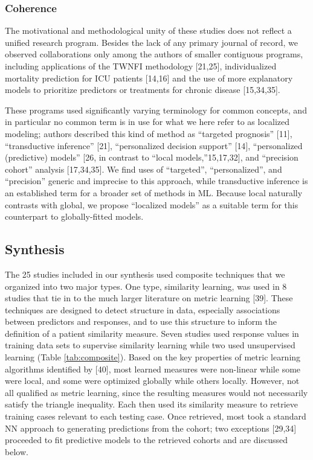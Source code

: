\documentclass[preprint, 3p,
authoryear]{elsarticle} %
\begin{document}
\hypertarget{coherence}{%
\subsubsection{Coherence}\label{coherence}}

The motivational and methodological unity of these studies does not
reflect a unified research program. Besides the lack of any primary
journal of record, we observed collaborations only among the authors of
smaller contiguous programs, including applications of the TWNFI
methodology {[}21,25{]}, individualized mortality prediction for ICU
patients {[}14,16{]} and the use of more explanatory models to
prioritize predictors or treatments for chronic disease {[}15,34,35{]}.

These programs used significantly varying terminology for common
concepts, and in particular no common term is in use for what we here
refer to as localized modeling; authors described this kind of method as
``targeted prognosis'' {[}11{]}, ``transductive inference'' {[}21{]},
``personalized decision support'' {[}14{]}, ``personalized (predictive)
models'' {[}26, in contrast to ``local models,''15,17,32{]}, and
``precision cohort'' analysis {[}17,34,35{]}. We find uses of
``targeted'', ``personalized'', and ``precision'' generic and imprecise
to this approach, while transductive inference is an established term
for a broader set of methods in ML. Because local naturally contrasts
with global, we propose ``localized models'' as a suitable term for this
counterpart to globally-fitted models.

\hypertarget{synthesis-1}{%
\subsection{Synthesis}\label{synthesis-1}}

The 25 studies included in our synthesis used composite techniques that
we organized into two major types. One type, similarity learning, was
used in 8 studies that tie in to the much larger literature on metric
learning {[}39{]}. These techniques are designed to detect structure in
data, especially associations between predictors and responses, and to
use this structure to inform the definition of a patient similarity
measure. Seven studies used response values in training data sets to
supervise similarity learning while two used unsupervised learning
(Table \ref{tab:composite}). Based on the key properties of metric
learning algorithms identified by {[}40{]}, most learned measures were
non-linear while some were local, and some were optimized globally while
others locally. However, not all qualified as metric learning, since the
resulting measures would not necessarily satisfy the triangle
inequality. Each then used its similarity measure to retrieve training
cases relevant to each testing case. Once retrieved, most took a
standard NN approach to generating predictions from the cohort; two
exceptions {[}29,34{]} proceeded to fit predictive models to the
retrieved cohorts and are discussed below.
\end{document}
